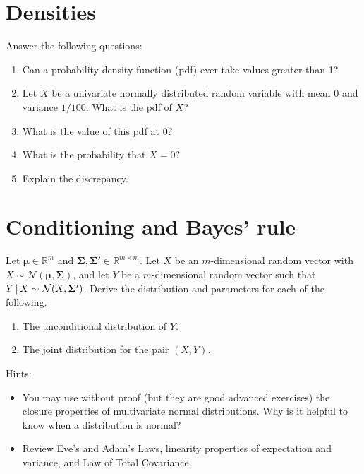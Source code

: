 \documentclass[submit]{harvardml}
\newcommand{\R}{\mathbb{R}}
\renewcommand{\v}[1]{\mathbf{#1}}
\begin{document}
\newpage
\section*{Densities}
\begin{problem}
Answer the following questions:
\begin{enumerate}[label=(\alph*)]
  \item Can a probability density function (pdf) ever take values greater than 1?
  \item Let $X$ be a univariate normally distributed random variable with mean 0
        and variance $1/100$. What is the pdf of $X$?
  \item What is the value of this pdf at 0?
  \item What is the probability that $X = 0$?
  \item Explain the discrepancy.
\end{enumerate}
\end{problem}
\newpage
\section*{Conditioning and Bayes' rule}
\begin{problem}
  Let $\v \mu \in \R^m$ and
  $\v \Sigma, \v \Sigma' \in \R^{m \times m}$.  Let $X$ be an
  $m$-dimensional random vector with
  $X \sim \mathcal{N}(\v \mu, \v \Sigma)$, and let $Y$ be a
  $m$-dimensional random vector such that
  $Y \given X \sim \mathcal{N}(X, \v \Sigma')$. Derive the
  distribution and parameters for each of the following.

\begin{enumerate}[label=(\alph*)]
  \item The unconditional distribution of $Y$.

  \item The joint distribution for the pair $(X,Y)$.

\end{enumerate}

Hints:
\begin{itemize}
\item You may use without proof (but they are good advanced exercises)
  the closure properties of multivariate normal distributions. Why is
  it helpful to know when a distribution is normal?
\item Review Eve's and Adam's Laws, linearity properties of
  expectation and variance, and Law of Total Covariance.

\end{itemize}

\end{problem}
\end{document}
